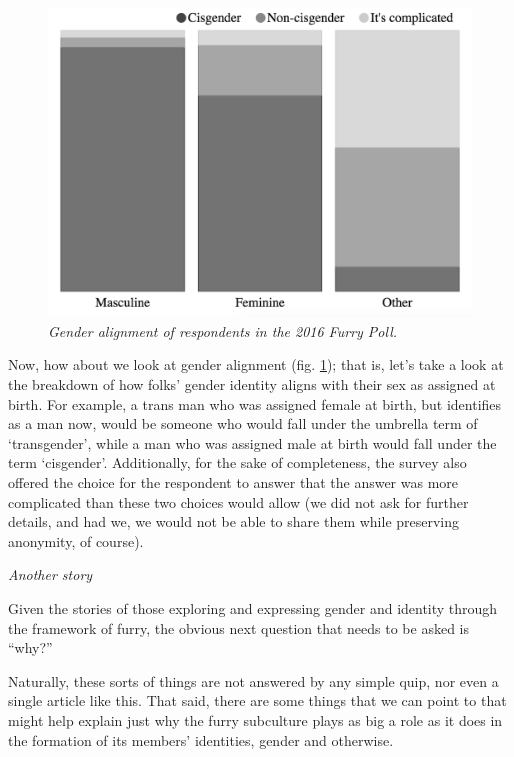 \begin{figure}
  \centering
  \includegraphics[scale=0.45]{assets/alignment.png}
  \caption{\textit{Gender alignment of respondents in the 2016 Furry Poll.}}
  \label{fig:alignment}
\end{figure}

Now, how about we look at gender alignment (fig. \ref{fig:alignment}); that is, let's take a look at the breakdown of how folks' gender identity aligns with their sex as assigned at birth.  For example, a trans man who was assigned female at birth, but identifies as a man now, would be someone who would fall under the umbrella term of `transgender', while a man who was assigned male at birth would fall under the term `cisgender'.  Additionally, for the sake of completeness, the survey also offered the choice for the respondent to answer that the answer was more complicated than these two choices would allow (we did not ask for further details, and had we, we would not be able to share them while preserving anonymity, of course).

\secdiv

\begin{center}
  \textit{Another story}
\end{center}

\secdiv

Given the stories of those exploring and expressing gender and identity through the framework of furry, the obvious next question that needs to be asked is ``why?''

Naturally, these sorts of things are not answered by any simple quip, nor even a single article like this.  That said, there are some things that we can point to that might help explain just why the furry subculture plays as big a role as it does in the formation of its members' identities, gender and otherwise.

